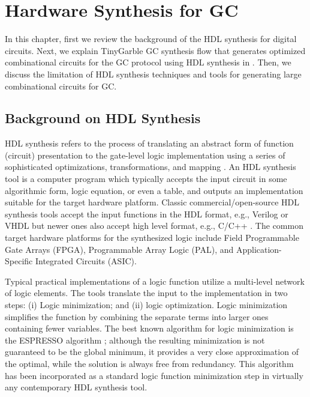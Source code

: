 \chapter{Hardware Synthesis for GC}\label{chap:syn}
In this chapter, first we review the background of the HDL synthesis for digital circuits.
Next, we explain TinyGarble GC synthesis flow that generates optimized combinational circuits for the GC protocol using HDL synthesis in .
Then, we discuss the limitation of HDL synthesis techniques and tools for generating large combinational circuits for GC.

\section{Background on HDL Synthesis}\label{sec:syn-back}
HDL synthesis refers to the process of translating an abstract form of  function (circuit) presentation to the gate-level logic implementation using a series of sophisticated optimizations, transformations, and mapping \cite{sentovich1992sis,micheli1994synthesis,devadas1994logic,brayton1987mis}.
An HDL synthesis tool is a computer program which typically accepts the input circuit in some algorithmic form, logic equation, or even a table, and outputs an implementation suitable for the target hardware platform.
Classic commercial/open-source HDL synthesis tools accept the input functions in the HDL format, e.g., Verilog or VHDL \cite{tool:DesignCompiler,tool:ABC,tool:Encounter,tool:HDLdesigner,tool:PandA,decaluwe2004myhdl} but newer ones also accept high level format, e.g., C/C++ \cite{Gupta2004, tool:Vivado}.
The common target hardware platforms for the synthesized logic include Field Programmable Gate Arrays (FPGA), Programmable Array Logic (PAL), and Application-Specific Integrated Circuits (ASIC).

Typical practical implementations of a logic function utilize a multi-level network of logic elements.
The tools translate the input to the implementation in two steps: (i) Logic minimization; and (ii) logic optimization.
Logic minimization simplifies the function by combining the separate terms into larger ones containing fewer variables.
The best known algorithm for logic minimization is the ESPRESSO algorithm \cite{brayton1984logic}; although the resulting minimization is not guaranteed to be the global minimum, it provides a very close approximation of the optimal, while the solution is always free from redundancy.
This algorithm has been incorporated as a standard logic function minimization step in virtually any contemporary HDL synthesis tool.

